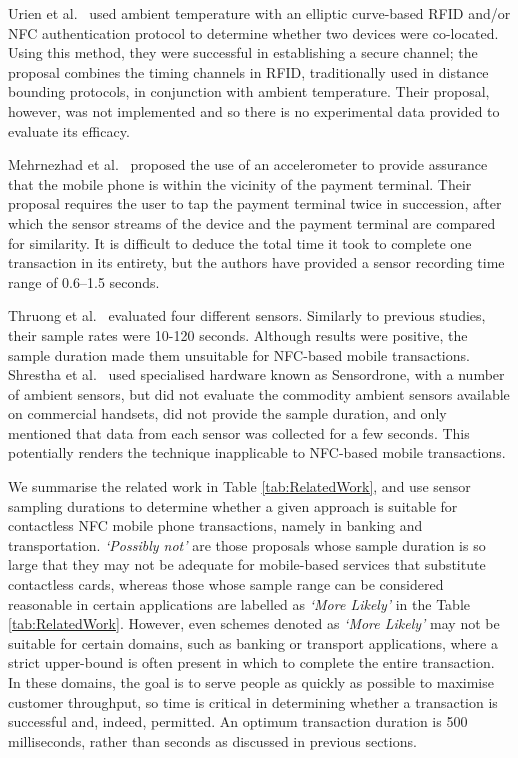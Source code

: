 \documentclass[runningheads,a4paper]{llncs}
\begin{document}
Urien et al.\ \cite{Urien201428} used ambient temperature with an elliptic curve-based RFID and/or NFC authentication protocol to determine whether two devices were co-located.  Using this method, they were successful in establishing a secure channel; the proposal combines the timing channels in RFID, traditionally used in distance bounding protocols, in conjunction with ambient temperature.  Their proposal, however, was not implemented and so there is no experimental data provided to evaluate its efficacy.

Mehrnezhad et al.\ \cite{mehrnezhad2014tap} proposed the use of an accelerometer to provide assurance that the mobile phone is within the vicinity of the payment terminal.  Their proposal requires the user to tap the payment terminal twice in succession, after which the sensor streams of the device and the payment terminal are compared for similarity.  It is difficult to deduce the total time it took to complete one transaction in its entirety, but the authors have provided a sensor recording time range of 0.6--1.5 seconds.

Thruong et al.\ \cite{truong2014comparing} evaluated four different sensors. Similarly to previous studies, their sample rates were 10-120 seconds. Although results were positive, the sample duration made them unsuitable for NFC-based mobile transactions. Shrestha et al.\ \cite{shrestha2014drone} used specialised hardware known as Sensordrone, with a number of ambient sensors, but did not evaluate the commodity ambient sensors available on commercial handsets, did not provide the sample duration, and only mentioned that data from each sensor was collected for a few seconds. This potentially renders the technique inapplicable to NFC-based mobile transactions. 


We summarise the related work in Table \ref{tab:RelatedWork}, and use sensor sampling durations to determine whether a given approach is suitable for contactless NFC mobile phone transactions, namely in banking and transportation.  \emph{`Possibly not'} are those proposals whose sample duration is so large that they may not be adequate for mobile-based services that substitute contactless cards, whereas those whose sample range can be considered reasonable in certain applications are labelled as \emph{`More Likely'} in the Table \ref{tab:RelatedWork}. However, even schemes denoted as \emph{`More Likely'} may not be suitable for certain domains, such as banking or transport applications, where a strict upper-bound is often present in which to complete the entire transaction.  In these domains, the goal is to serve people as quickly as possible to maximise customer throughput, so time is critical in determining whether a transaction is successful and, indeed, permitted.  An optimum transaction duration is 500 milliseconds, rather than seconds as discussed in previous sections. 
\end{document}
